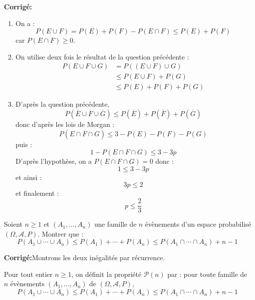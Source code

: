 \documentclass[a4paper,twoside,french,10pt]{VcCours}
\newcommand{\corr}{\textbf{Corrigé:}}
\begin{document}
\corr 
\begin{enumerate}
\item On a :
$$ P(E \cup F) = P(E) + P(F) - P(E \cap F) \leq P(E)+P(F)$$
car $P(E \cap F) \geq 0$.
\item On utilise deux fois le résultat de la question précédente :
\begin{align*}
P(E \cup F \cup G) & = P((E \cup F) \cup G) \\
& \leq P(E \cup F) + P(G) \\
& \leq P(E) + P(F) + P(G)
\end{align*}
\item D'après la question précédente,
$$ P(\overline{E} \cup \overline{F} \cup \overline{G})  \leq  P(\overline{E}) + P(\overline{F}) + P(\overline{G})$$
donc d'après les lois de Morgan :
$$ P(\overline{E \cap F \cap G}) \leq 3-P(E)-P(F)-P(G)$$
puis :
$$ 1-P(E \cap F \cap G) \leq 3-3p$$
D'après l'hypothèse, on a $P(E \cap F \cap G)=0$ donc :
$$ 1 \leq 3-3p$$
et ainsi :
$$3p \leq 2$$
et finalement :
$$ p \leq \dfrac{2}{3}$$
\end{enumerate}


\begin{Exercice}{} Soient $n \geq 1$ et $(A_1, \ldots, A_n)$ une famille de $n$ évènements d'un espace probabilisé $(\Omega, \mathcal{A}, P)$. Montrer que :
$$ P(A_1 \cup \cdots \cup A_n) \leq P(A_1) + \cdots + P(A_n) \leq P(A_1 \cap \cdots \cap A_n) + n-1$$
\end{Exercice}

\corr Montrons les deux inégalités par récurrence.



\noindent Pour tout entier $n \geq 1$, on définit la propriété $\mathcal{P}(n)$ par : pour toute famille de $n$ évènements $(A_1, \ldots, A_n)$ de $(\Omega, \mathcal{A}, P)$, 
$$ P(A_1 \cup \cdots \cup A_n) \leq P(A_1) + \cdots + P(A_n) \leq P(A_1 \cap \cdots \cap A_n) + n-1$$
\end{document}
